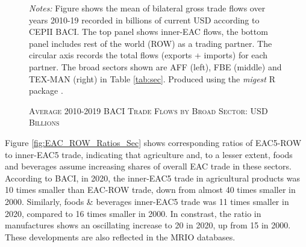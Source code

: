\documentclass[a4paper]{article}
\begin{document}
\begin{figure}[h!] \vspace{-1mm}
\centering
\caption{\label{fig:MIG_SEC_BACI}\textsc{Average 2010-2019 BACI Trade Flows by Broad Sector: USD Billions}}
\vspace{2mm}
\raggedright
\scriptsize 
\emph{Notes:} Figure shows the mean of bilateral gross trade flows over years 2010-19 recorded in billions of current USD according to CEPII BACI. The top panel shows inner-EAC flows, the bottom panel includes rest of the world (ROW) as a trading partner. The circular axis records the total flows (exports + imports) for each partner. The broad sectors shown are AFF (left), FBE (middle) and TEX-MAN (right) in Table \ref{tab:sec}. Produced using the \emph{migest} R package \citep{rmigest}.
\end{figure}
\FloatBarrier

Figure \ref{fig:EAC_ROW_Ratios_Sec} shows corresponding ratios of EAC5-ROW to inner-EAC5 trade, indicating that agriculture and, to a lesser extent, foods and beverages assume increasing shares of overall EAC trade in these sectors. According to BACI, in 2020, the inner-EAC5 trade in agricultural products was 10 times smaller than EAC-ROW trade, down from almost 40 times smaller in 2000. Similarly, foods \& beverages inner-EAC5 trade was 11 times smaller in 2020, compared to 16 times smaller in 2000. In constrast, the ratio in manufactures shows an oscillating increase to 20 in 2020, up from 15 in 2000. These developments are also reflected in the MRIO databases. 
\end{document}
